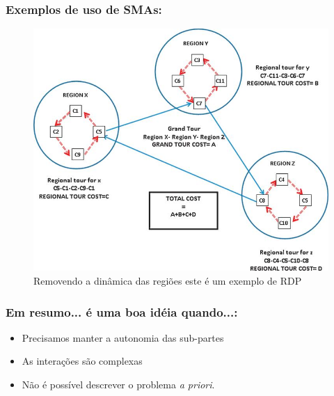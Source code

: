 \begin{frame} %

  \frametitle{Exemplos de uso de SMAs:}
        
\begin{figure}[!ht]
\centering
\includegraphics[height =.6\textheight,width=.7\textwidth]{figuras/example_SMAs03.jpg}
\caption{Removendo a dinâmica das regiões este é um exemplo de RDP}
\end{figure}
    
\end{frame}


\begin{frame} %

\frametitle{Em resumo... é uma boa idéia quando...:}


\begin{itemize}
  \item Precisamos manter a autonomia das sub-partes
  \item As interações são complexas
  \item Não é possível descrever o problema \textit{a priori}.
\end{itemize}
\end{frame}

